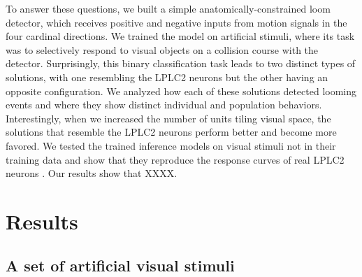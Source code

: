 \documentclass[9pt,lineno]{elife}
\begin{document}
To answer these questions, we built a simple anatomically-constrained loom detector, which receives positive and negative inputs from motion signals in the four cardinal directions. We trained the model on artificial stimuli, where its task was to selectively respond to visual objects on a collision course with the detector. Surprisingly, this binary classification task leads to two distinct types of solutions, with one resembling the LPLC2 neurons but the other having an opposite configuration. We analyzed how each of these solutions detected looming events and where they show distinct individual and population behaviors. Interestingly, when we increased the number of units tiling visual space, the solutions that resemble the LPLC2 neurons perform better and become more favored. We tested the trained inference models on visual stimuli not in their training data and show that they reproduce the response curves of real LPLC2 neurons \citep{klapoetke2017ultra}. Our results show that XXXX. 

\section{Results}

\subsection{A set of artificial visual stimuli}



\end{document}
